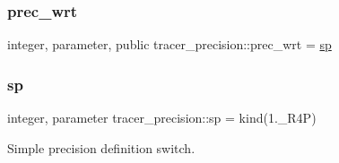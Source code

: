 \mbox{\label{namespacetracer__precision_a57302c8b2d241e00360158d172f89d3c}} 
\subsubsection{\texorpdfstring{prec\+\_\+wrt}{prec\_wrt}}
{\footnotesize\ttfamily integer, parameter, public tracer\+\_\+precision\+::prec\+\_\+wrt = \mbox{\hyperlink{namespacetracer__precision_aaa3f9cb7ed44699611a16d61ca9131fb}{sp}}}

\mbox{\label{namespacetracer__precision_aaa3f9cb7ed44699611a16d61ca9131fb}} 
\subsubsection{\texorpdfstring{sp}{sp}}
{\footnotesize\ttfamily integer, parameter tracer\+\_\+precision\+::sp = kind(1.\+\_\+\+R4P)\hspace{0.3cm}{\ttfamily [private]}}



Simple precision definition switch. 

